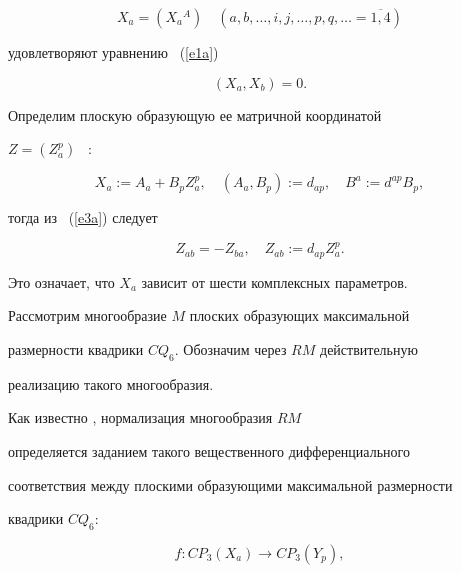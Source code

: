 \begin{equation}


\label{e2a}


X_a=(X_a{}^A)\quad (a,b,\dotsc,i,j,\dotsc,p,q,\dotsc=\overline{1,4})


\end{equation}


удовлетворяют уравнению ~(\ref{e1a})


\begin{equation}


\label{e3a}


(X_a,X_b)=0.


\end{equation}


Определим плоскую образующую ее матричной координатой


$Z=(Z_a^p)$ ~\cite{4}:


\begin{equation}


\label{e4a}


X_a:=A_a+B_pZ^p_a,\quad (A_a,B_p):=d_{ap},\quad B^a:=d^{ap}B_p,


\end{equation}


тогда из ~(\ref{e3a}) следует


\begin{equation}


\label{e5a}


Z_{ab}=-Z_{ba},\quad Z_{ab}:=d_{ap}Z_a^p.


\end{equation}


Это означает, что $X_a$ зависит от шести комплексных параметров.


Рассмотрим многообразие $M$ плоских образующих максимальной


размерности квадрики $CQ_6$. Обозначим через $RM$ действительную


реализацию такого многообразия.


Как известно \cite{1}, нормализация многообразия $RM$


определяется заданием такого вещественного дифференциального


соответствия между плоскими образующими максимальной размерности


квадрики $CQ_6$:


\begin{equation}


\label{e6a}


f: CP_3(X_a)\rightarrow CP_3(Y_p),


\end{equation}


